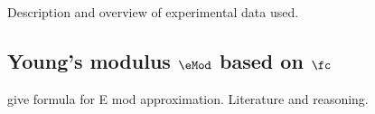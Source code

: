 Description and overview of experimental data used.

\subsection{Young's modulus $\eMod$ based on $\fc$}
give formula for E mod approximation.
Literature and reasoning.
